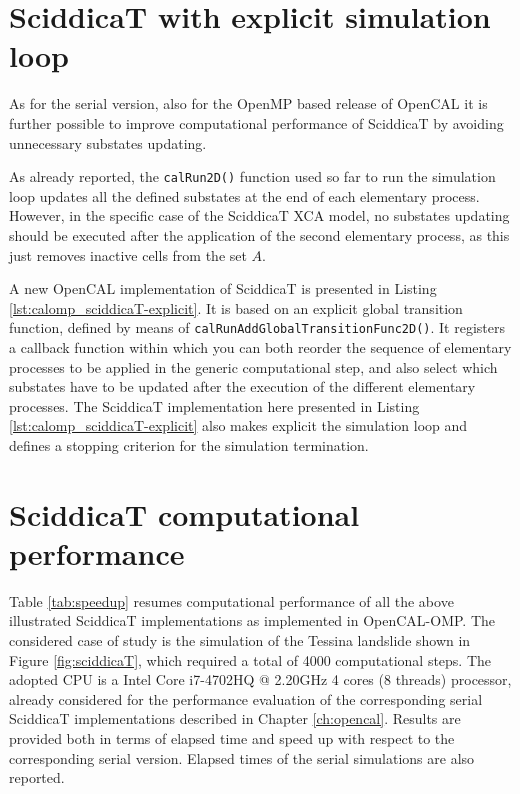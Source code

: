 \section{SciddicaT with explicit simulation loop}

As for the serial version, also for the OpenMP based release of
OpenCAL it is further possible to improve computational performance of
SciddicaT by avoiding unnecessary substates updating.

As already reported, the \verb'calRun2D()' function used so far to
run the simulation loop updates all the defined substates at the end
of each elementary process. However, in the specific case of the
SciddicaT XCA model, no substates updating should be executed after
the application of the second elementary process, as this just removes
inactive cells from the set $A$.

A new OpenCAL implementation of SciddicaT is presented in Listing
\ref{lst:calomp_sciddicaT-explicit}. It is based on an explicit global
transition function, defined by means of
\verb'calRunAddGlobalTransitionFunc2D()'. It registers a callback
function within which you can both reorder the sequence of elementary
processes to be applied in the generic computational step, and also
select which substates have to be updated after the execution of the
different elementary processes. The SciddicaT implementation here
presented in Listing \ref{lst:calomp_sciddicaT-explicit} also
makes explicit the simulation loop and defines a stopping criterion for
the simulation termination.




\section{SciddicaT computational performance}

Table \ref{tab:speedup} resumes computational performance of all the
above illustrated SciddicaT implementations as implemented in
OpenCAL-OMP. The considered case of study is the simulation of the
Tessina landslide shown in Figure \ref{fig:sciddicaT}, which required
a total of 4000 computational steps. The adopted CPU is a Intel Core
i7-4702HQ @ 2.20GHz 4 cores (8 threads) processor, already considered
for the performance evaluation of the corresponding serial SciddicaT
implementations described in Chapter \ref{ch:opencal}. Results are
provided both in terms of elapsed time and speed up with respect to
the corresponding serial version. Elapsed times of the serial
simulations are also reported.

